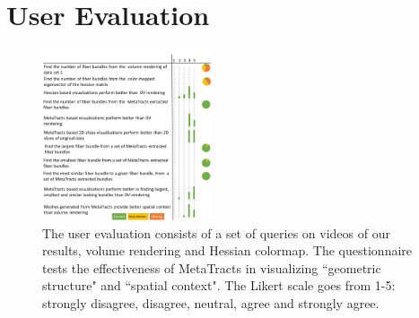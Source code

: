 \section {User Evaluation}
\label {sec:user_eval}
\begin{figure}[tb]
	\centering
	\includegraphics[width=0.45\textwidth,  trim = 0mm 00mm 0mm 0mm, clip]{images_pvis/usereval2}
	\caption{The user evaluation consists of a set of queries on videos of our results, volume rendering and Hessian colormap. The questionnaire tests the effectiveness of MetaTracts in visualizing ``geometric structure" and ``spatial context". The Likert scale goes from 1-5: strongly disagree, disagree, neutral, agree and strongly agree. }
	\label{fig:userstudy}
\end{figure}
